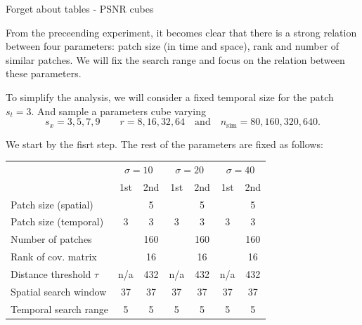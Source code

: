 \documentclass[mathserif, 8pt]{beamer}
\begin{document}
\begin{frame}{Forget about tables - PSNR cubes}

	From the preceending experiment, it becomes clear that there is a strong
	relation between four parameters: patch size (in time and space), rank and
	number of similar patches. We will fix the search range and focus on the
	relation between these parameters.

	\bigskip

	To simplify the analysis, we will consider a fixed temporal size for the 
	patch $s_t = 3$. And sample a parameters cube varying 
	\[s_x = 3, 5, 7, 9 \quad\quad r = 8, 16, 32, 64 \quad\text{and}\quad n_{\text{sim}} = 80, 160, 320, 640.\] 

	We start by the fisrt step. The rest of the parameters are fixed as follows:

	\begin{center}
	\begin{tabular}{l | c c | c c | c c }
		& \multicolumn{2}{c|}{$\sigma = 10$} 
		& \multicolumn{2}{c|}{$\sigma = 20$} 
		& \multicolumn{2}{c}{$\sigma = 40$} \\
		                            & 1st  & 2nd  & 1st  & 2nd  & 1st  & 2nd \\\hline\hline
		Patch size (spatial)        &      &   5  &      &   5  &      &   5 \\
		Patch size (temporal)       &  3   &   3  &  3   &   3  &  3   &   3 \\
		Number of patches           &      & 160  &      & 160  &      & 160 \\
		Rank of cov. matrix         &      &  16  &      &  16  &      &  16 \\
		Distance threshold $\tau$   & n/a  & 432  & n/a  & 432  & n/a  & 432 \\
		Spatial search window       & 37   &  37  & 37   &  37  & 37   &  37 \\
		Temporal search range       & 5    & 5    & 5    & 5    & 5    & 5   \\\hline
	\end{tabular}
	\end{center}

\end{frame}
\end{document}
